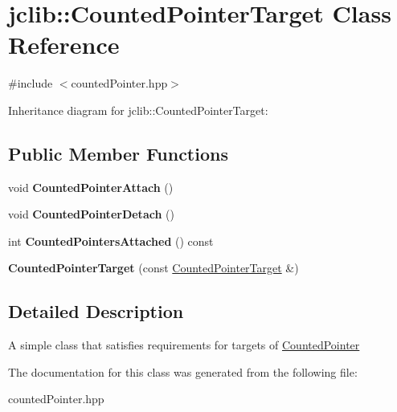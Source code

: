 \hypertarget{classjclib_1_1CountedPointerTarget}{}\section{jclib\+:\+:Counted\+Pointer\+Target Class Reference}
\label{classjclib_1_1CountedPointerTarget}


{\ttfamily \#include $<$counted\+Pointer.\+hpp$>$}



Inheritance diagram for jclib\+:\+:Counted\+Pointer\+Target\+:
\subsection*{Public Member Functions}
\begin{DoxyCompactItemize}
\item 
\mbox{\label{classjclib_1_1CountedPointerTarget_a5280d04886b6b153aef29191a466cd58}} 
void {\bfseries Counted\+Pointer\+Attach} ()
\item 
\mbox{\label{classjclib_1_1CountedPointerTarget_a56b846a37c255af2bfc8320fe322d90e}} 
void {\bfseries Counted\+Pointer\+Detach} ()
\item 
\mbox{\label{classjclib_1_1CountedPointerTarget_a2f2a5a38758f5b84d6491ef535782eeb}} 
int {\bfseries Counted\+Pointers\+Attached} () const
\item 
\mbox{\label{classjclib_1_1CountedPointerTarget_a99a879fc1b59a1b214d820f6b2aa5221}} 
{\bfseries Counted\+Pointer\+Target} (const \hyperlink{classjclib_1_1CountedPointerTarget}{Counted\+Pointer\+Target} \&)
\end{DoxyCompactItemize}


\subsection{Detailed Description}
A simple class that satisfies requirements for targets of \hyperlink{classjclib_1_1CountedPointer}{Counted\+Pointer} 

The documentation for this class was generated from the following file\+:\begin{DoxyCompactItemize}
\item 
counted\+Pointer.\+hpp\end{DoxyCompactItemize}
